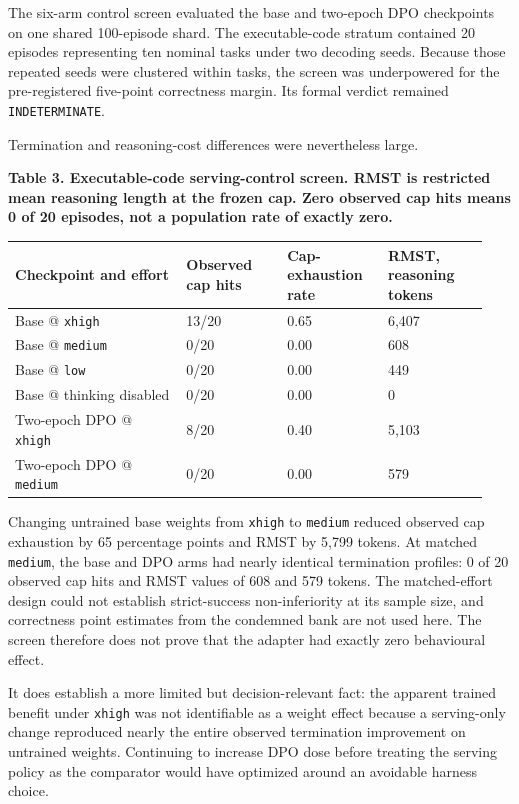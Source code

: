 \documentclass[
]{article}
\newcounter{none} %
\begin{document}
The six-arm control screen evaluated the base and two-epoch DPO
checkpoints on one shared 100-episode shard. The executable-code stratum
contained 20 episodes representing ten nominal tasks under two decoding
seeds. Because those repeated seeds were clustered within tasks, the
screen was underpowered for the pre-registered five-point correctness
margin. Its formal verdict remained \texttt{INDETERMINATE}.

Termination and reasoning-cost differences were nevertheless large.

\textbf{Table 3. Executable-code serving-control screen. RMST is
restricted mean reasoning length at the frozen cap. Zero observed cap
hits means 0 of 20 episodes, not a population rate of exactly zero.}

{\def\LTcaptype{none} %
\begin{longtable}[]{@{}p{0.34\linewidth}p{0.20\linewidth}p{0.20\linewidth}p{0.20\linewidth}@{}}
\toprule\noalign{}
Checkpoint and effort & Observed cap hits & Cap-exhaustion rate & RMST,
reasoning tokens \\
\midrule\noalign{}
\endhead
\bottomrule\noalign{}
\endlastfoot
Base @ \texttt{xhigh} & 13/20 & 0.65 & 6,407 \\
Base @ \texttt{medium} & 0/20 & 0.00 & 608 \\
Base @ \texttt{low} & 0/20 & 0.00 & 449 \\
Base @ thinking disabled & 0/20 & 0.00 & 0 \\
Two-epoch DPO @ \texttt{xhigh} & 8/20 & 0.40 & 5,103 \\
Two-epoch DPO @ \texttt{medium} & 0/20 & 0.00 & 579 \\
\end{longtable}
}

Changing untrained base weights from \texttt{xhigh} to \texttt{medium}
reduced observed cap exhaustion by 65 percentage points and RMST by
5,799 tokens. At matched \texttt{medium}, the base and DPO arms had
nearly identical termination profiles: 0 of 20 observed cap hits and
RMST values of 608 and 579 tokens. The matched-effort design could not
establish strict-success non-inferiority at its sample size, and
correctness point estimates from the condemned bank are not used here.
The screen therefore does not prove that the adapter had exactly zero
behavioural effect.

It does establish a more limited but decision-relevant fact: the
apparent trained benefit under \texttt{xhigh} was not identifiable as a
weight effect because a serving-only change reproduced nearly the entire
observed termination improvement on untrained weights. Continuing to
increase DPO dose before treating the serving policy as the comparator
would have optimized around an avoidable harness choice.
\end{document}

